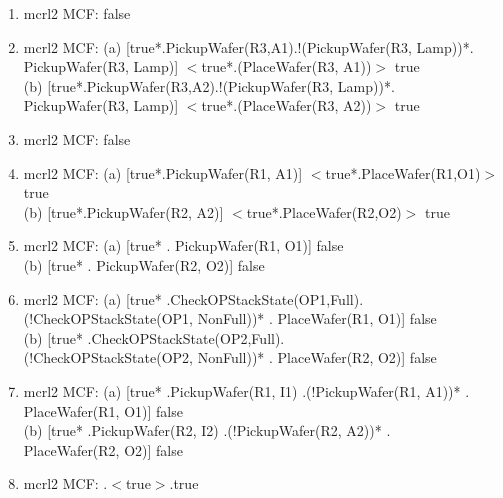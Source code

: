 \documentclass[a4paper,12pt]{article}
\begin{document}
\begin{enumerate}
		\item mcrl2 MCF:  false
		\item mcrl2 MCF: \newline(a) [true*.PickupWafer(R3,A1).!(PickupWafer(R3, Lamp))*.\\PickupWafer(R3, Lamp)] $<$true*.(PlaceWafer(R3, A1))$>$ true							
		\\ (b) [true*.PickupWafer(R3,A2).!(PickupWafer(R3, Lamp))*.\\PickupWafer(R3, Lamp)] $<$true*.(PlaceWafer(R3, A2))$>$ true		
		\item mcrl2 MCF:  false
		\item mcrl2 MCF: \newline(a) [true*.PickupWafer(R1, A1)] $<$true*.PlaceWafer(R1,O1)$>$ true									
		\\ (b) [true*.PickupWafer(R2, A2)] $<$true*.PlaceWafer(R2,O2)$>$ true
		\item mcrl2 MCF: \newline(a) [true* . PickupWafer(R1, O1)] false		 		
		\\ (b) [true* . PickupWafer(R2, O2)] false 
		\item mcrl2 MCF: \newline(a) [true* .CheckOPStackState(OP1,Full). \\(!CheckOPStackState(OP1, NonFull))* . PlaceWafer(R1, O1)] false 				 		
		\\ (b) [true* .CheckOPStackState(OP2,Full). \\(!CheckOPStackState(OP2, NonFull))* . PlaceWafer(R2, O2)] false
		\item mcrl2 MCF: \newline(a) [true* .PickupWafer(R1, I1) .(!PickupWafer(R1, A1))* . \\PlaceWafer(R1, O1)] false 		 				 		
		\\ (b) [true* .PickupWafer(R2, I2) .(!PickupWafer(R2, A2))* . \\PlaceWafer(R2, O2)] false 				 						
		\item mcrl2 MCF:  \newline[true*].$<$true$>$.true
		
	\end{enumerate}
\end{document}
